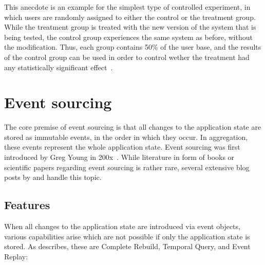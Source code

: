 This anecdote is an example for the simplest type of controlled experiment, in which users are randomly assigned to either the control or the treatment group.
While the treatment group is treated with the new version of the system that is being tested, the control group experiences the same system as before, without the modification.
Thus, each group contains 50\% of the user base, and the results of the control group can be used in order to control wether the treatment had any statistically significant effect~\cite{Kohavi2009}.

\section{Event sourcing}
\label{sec:fundamentals:event}

The core premise of event sourcing is that all changes to the application state are stored as immutable events, in the order in which they occur.
In aggregation, these events represent the whole application state.
Event sourcing was first introduced by Greg Young in 200x~\cite{???}.
While literature in form of books or scientific papers regarding event sourcing is rather rare, several extensive blog posts by \citet{WEB:Fowler:2005} and \citet{Todo:WEB:Young:200x} handle this topic.


\subsection{Features}

When all changes to the application state are introduced via event objects, various capabilities arise which are not possible if only the application state is stored.
As \citet{WEB:Fowler:2005} describes, these are Complete Rebuild, Temporal Query, and Event Replay:

